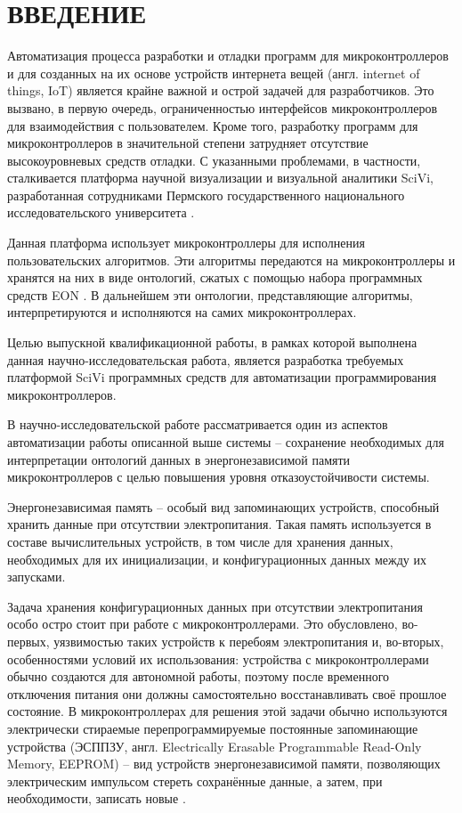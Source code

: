 \chapter*{ВВЕДЕНИЕ}

Автоматизация процесса разработки и отладки программ для микроконтроллеров и для созданных на их основе устройств интернета вещей (англ. internet of things, IoT) является крайне важной и острой задачей для разработчиков.
Это вызвано, в первую очередь, ограниченностью интерфейсов микроконтроллеров для взаимодействия с пользователем.
Кроме того, разработку программ для микроконтроллеров в значительной степени затрудняет отсутствие высокоуровневых средств отладки.
С указанными проблемами, в частности, сталкивается платформа научной визуализации и визуальной аналитики SciVi, разработанная сотрудниками Пермского государственного национального исследовательского университета \cite{article:scivi, article:scivi-overview}.

Данная платформа использует микроконтроллеры для исполнения пользовательских алгоритмов.
Эти алгоритмы передаются на микроконтроллеры и хранятся на них в виде онтологий, сжатых с помощью набора программных средств EON \cite{incollection:eon-main, booktel:eon-communications}.
В дальнейшем эти онтологии, представляющие алгоритмы, интерпретируются и исполняются на самих микроконтроллерах.

Целью выпускной квалификационной работы, в рамках которой выполнена данная научно-исследовательская работа, является разработка требуемых платформой SciVi программных средств для автоматизации программирования микроконтроллеров.

В научно-исследовательской работе рассматривается один из аспектов автоматизации работы описанной выше системы -- сохранение необходимых для интерпретации онтологий данных в энергонезависимой памяти микроконтроллеров с целью повышения уровня отказоустойчивости системы.

Энергонезависимая память -- особый вид запоминающих устройств, способный хранить данные при отсутствии электропитания.
Такая память используется в составе вычислительных устройств, в том числе для хранения данных, необходимых для их инициализации, и конфигурационных данных между их запусками.

Задача хранения конфигурационных данных при отсутствии электропитания особо остро стоит при работе с микроконтроллерами.
Это обусловлено, во-первых, уязвимостью таких устройств к перебоям электропитания и, во-вторых, особенностями условий их использования: устройства с микроконтроллерами обычно создаются для автономной работы, поэтому после временного отключения питания они должны самостоятельно восстанавливать своё прошлое состояние.
В микроконтроллерах для решения этой задачи обычно используются электрически стираемые перепрограммируемые постоянные запоминающие устройства (ЭСППЗУ, англ. Electrically Erasable Programmable Read-Only Memory, EEPROM) -- вид устройств энергонезависимой памяти, позволяющих электрическим импульсом стереть сохранённые данные, а затем, при необходимости, записать новые \cite{incollection:eeprom-proposal, article:eeprom}.

